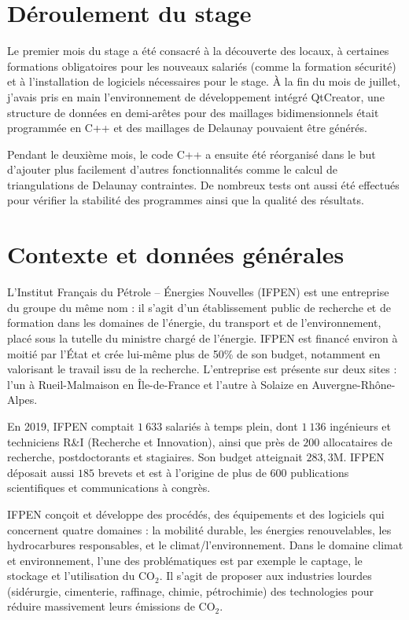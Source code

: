 \documentclass[12pt,a4paper,draft]{report}
\begin{document}
\section{Déroulement du stage}
Le premier mois du stage a été consacré à la découverte des locaux, à certaines formations obligatoires pour les nouveaux salariés (comme la formation sécurité) et à l'installation de logiciels nécessaires pour le stage. \`A la fin du mois de juillet, j'avais pris en main l'environnement de développement intégré QtCreator, une structure de données en demi-arêtes pour des maillages bidimensionnels était programmée en C++ et des maillages de Delaunay pouvaient être générés.

Pendant le deuxième mois, le code C++ a ensuite été réorganisé dans le but d'ajouter plus facilement d'autres fonctionnalités comme le calcul de triangulations de Delaunay contraintes. De nombreux tests ont aussi été effectués pour vérifier la stabilité des programmes ainsi que la qualité des résultats.

\section{Contexte et données générales}
L'Institut Français du Pétrole -- \'Energies Nouvelles (IFPEN) est une entreprise du groupe du même nom : il s'agit d'un établissement public de recherche et de formation dans les domaines de l'énergie, du transport et de l'environnement, placé sous la tutelle du ministre chargé de l'énergie. IFPEN est financé environ à moitié par l'\'Etat et crée lui-même plus de 50\% de son budget, notamment en valorisant le travail issu de la recherche. L'entreprise est présente sur deux sites : l'un à Rueil-Malmaison en \^Ile-de-France et l'autre à Solaize en Auvergne-Rhône-Alpes.

En 2019, IFPEN comptait $1\ 633$ salariés à temps plein, dont $1\ 136$ ingénieurs et techniciens R\&I (Recherche et Innovation), ainsi que près de $200$ allocataires de recherche, postdoctorants et stagiaires. Son budget atteignait $283,3$\textrm{M}\texteuro. IFPEN déposait aussi $185$ brevets et est à l'origine de plus de $600$ publications scientifiques et communications à congrès.

IFPEN conçoit et développe des procédés, des équipements et des logiciels qui concernent quatre domaines : la mobilité durable, les énergies renouvelables, les hydrocarbures responsables, et le climat/l'environnement. Dans le domaine climat et environnement, l'une des problématiques est par exemple le captage, le stockage et l'utilisation du CO$_2$. Il s'agit de proposer aux industries lourdes (sidérurgie, cimenterie, raffinage, chimie, pétrochimie) des technologies pour réduire massivement leurs émissions de CO$_2$.
\end{document}
